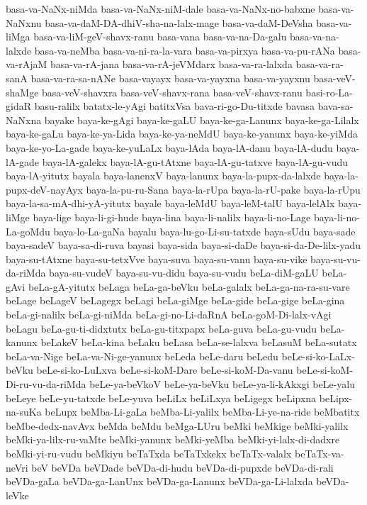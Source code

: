 {basa-va-NaNx-niMda
basa-va-NaNx-niM-dale
basa-va-NaNx-no-babxne
basa-va-NaNxnu
basa-va-daM-DA-dhiV-sha-na-lalx-mage
basa-va-daM-DeVsha
basa-va-liMga
basa-va-liM-geV-shavx-ranu
basa-vana
basa-va-na-Da-galu
basa-va-na-lalxde
basa-va-neMba
basa-va-ni-ra-la-vara
basa-va-pirxya
basa-va-pu-rANa
basa-va-rAjaM
basa-va-rA-jana
basa-va-rA-jeVMdarx
basa-va-ra-lalxda
basa-va-ra-sanA
basa-va-ra-sa-nANe
basa-vayayx
basa-va-yayxna
basa-va-yayxnu
basa-veV-shaMge
basa-veV-shavxra
basa-veV-shavx-rana
basa-veV-shavx-ranu
basi-ro-La-gidaR
basu-ralilx
batatx-le-yAgi
batitxVsa
bava-ri-go-Du-titxde
bavasa
bava-sa-NaNxna
bayake
baya-ke-gAgi
baya-ke-gaLU
baya-ke-ga-Lanunx
baya-ke-ga-Lilalx
baya-ke-gaLu
baya-ke-ya-Lida
baya-ke-ya-neMdU
baya-ke-yanunx
baya-ke-yiMda
baya-ke-yo-La-gade
baya-ke-yuLaLx
baya-lAda
baya-lA-danu
baya-lA-dudu
baya-lA-gade
baya-lA-galekx
baya-lA-gu-tAtxne
baya-lA-gu-tatxve
baya-lA-gu-vudu
baya-lA-yitutx
bayala
baya-lanenxV
baya-lanunx
baya-la-pupx-da-lalxde
baya-la-pupx-deV-nayAyx
baya-la-pu-ru-Sana
baya-la-rUpa
baya-la-rU-pake
baya-la-rUpu
baya-la-sa-mA-dhi-yA-yitutx
bayale
baya-leMdU
baya-leM-talU
baya-lelAlx
baya-liMge
baya-lige
baya-li-gi-hude
baya-lina
baya-li-nalilx
baya-li-no-Lage
baya-li-no-La-goMdu
baya-lo-La-gaNa
bayalu
baya-lu-go-Li-su-tatxde
baya-sUdu
baya-sade
baya-sadeV
baya-sa-di-ruva
bayasi
baya-sida
baya-si-daDe
baya-si-da-De-lilx-yadu
baya-su-tAtxne
baya-su-tetxVve
baya-suva
baya-su-vanu
baya-su-vike
baya-su-vu-da-riMda
baya-su-vudeV
baya-su-vu-didu
baya-su-vudu
beLa-diM-gaLU
beLa-gAvi
beLa-gA-yitutx
beLaga
beLa-ga-beVku
beLa-galalx
beLa-ga-na-ra-su-vare
beLage
beLageV
beLagegx
beLagi
beLa-giMge
beLa-gide
beLa-gige
beLa-gina
beLa-gi-nalilx
beLa-gi-niMda
beLa-gi-no-Li-daRnA
beLa-goM-Di-lalx-vAgi
beLagu
beLa-gu-ti-didxtutx
beLa-gu-titxpapx
beLa-guva
beLa-gu-vudu
beLa-kanunx
beLakeV
beLa-kina
beLaku
beLasa
beLa-se-lalxva
beLasuM
beLa-sutatx
beLa-va-Nige
beLa-va-Ni-ge-yanunx
beLeda
beLe-daru
beLedu
beLe-si-ko-LaLx-beVku
beLe-si-ko-LuLxva
beLe-si-koM-Dare
beLe-si-koM-Da-vanu
beLe-si-koM-Di-ru-vu-da-riMda
beLe-ya-beVkoV
beLe-ya-beVku
beLe-ya-li-kAkxgi
beLe-yalu
beLeye
beLe-yu-tatxde
beLe-yuva
beLiLx
beLiLxya
beLigegx
beLipxna
beLipx-na-suKa
beLupx
beMba-Li-gaLa
beMba-Li-yalilx
beMba-Li-ye-na-ride
beMbatitx
beMbe-dedx-navAvx
beMda
beMdu
beMga-LUru
beMki
beMkige
beMki-yalilx
beMki-ya-lilx-ru-vaMte
beMki-yanunx
beMki-yeMba
beMki-yi-lalx-di-dadxre
beMki-yi-ru-vudu
beMkiyu
beTaTxda
beTaTxkekx
beTaTx-valalx
beTaTx-va-neVri
beV
beVDa
beVDade
beVDa-di-hudu
beVDa-di-pupxde
beVDa-di-rali
beVDa-gaLa
beVDa-ga-LanUnx
beVDa-ga-Lanunx
beVDa-ga-Li-lalxda
beVDa-leVke
}
